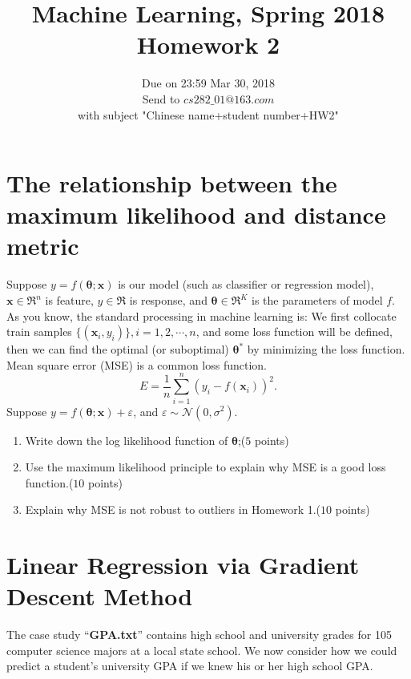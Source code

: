 \documentclass{article}
\newcommand{\mb}{\mathbf}
\begin{document}
\title{Machine Learning, Spring 2018\\Homework 2}
\date{Due on 23:59 Mar 30, 2018\\Send to $cs282\_01@163.com$ \\with subject "Chinese name+student number+HW2"}
\maketitle

\section{The relationship between the maximum likelihood and distance metric  } 
Suppose $y = f(\mb{\theta}; \mb{x})$ is our model (such as classifier or regression model), $\mb{x} \in \Re^n$ is feature, $y \in \Re$ is response, and $\mb{\theta} \in \Re^K$ is the parameters of model $f$. As you know, the standard processing in machine learning is: We first collocate train samples $\{(\mb{x}_i, y_i)\}, i = 1,2,\cdots,n$, and some loss function will be defined, then we can find the optimal (or suboptimal) $\mb{\theta}^*$ by minimizing the loss function. Mean square error (MSE) is a common loss function.
\begin{equation*}
E = \frac{1}{n}\sum\limits_{i=1}^n{(y_i-f(\mb{x}_i))^2}.
\end{equation*}
Suppose $y = f(\mb{\theta};\mb{x}) + \varepsilon$, and $\varepsilon \sim \mathcal{N}(0, \sigma^2)$.
\begin{enumerate}[(1)]
	\item  Write down the log likelihood function of $\mb{\theta}$;($5$ points)
	\item Use the maximum likelihood principle to explain why MSE is a good loss function.($10$ points)
	
	\item Explain why MSE is not robust to outliers in Homework 1.($10$ points)
\end{enumerate} 

\section{Linear Regression via Gradient Descent Method}
\label{problem1}
The case study ``\textbf{GPA.txt}'' contains high school and university grades for 105 computer science majors at a local state school. We now consider how we could predict a student's university GPA if we knew his or her high school GPA. 
\end{document}
